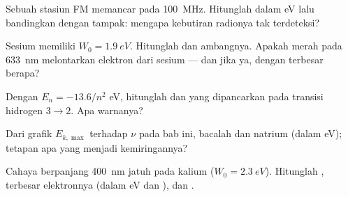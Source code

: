 \begin{exercise}[$\star$]\label{exo:g12:quantum-world:2}
Sebuah stasiun FM memancar pada \qty{100}{MHz}. Hitunglah   dalam
\unit{eV} lalu bandingkan dengan  tampak: mengapa kebutiran radionya tak terdeteksi?
\end{exercise}

\begin{exercise}[$\star$]\label{exo:g12:quantum-world:3}
Sesium memiliki $W_0 = \qty{1.9}{eV}$. Hitunglah  dan 
ambangnya. Apakah  merah pada \qty{633}{nm} melontarkan elektron dari sesium ---
dan jika ya, dengan  terbesar berapa?
\end{exercise}

\begin{exercise}[$\star$]\label{exo:g12:quantum-world:4}
Dengan $E_n = -13.6/n^2$ \unit{eV}, hitunglah  dan 
 yang dipancarkan pada transisi hidrogen $3 \to 2$. Apa warnanya?
\end{exercise}

\begin{exercise}[$\star$]\label{exo:g12:quantum-world:5}
Dari grafik $E_{k,\max}$ terhadap $\nu$ pada bab ini, bacalah 
dan  natrium (dalam \unit{eV}); tetapan apa yang menjadi kemiringannya?
\end{exercise}

\begin{exercise}[$\star\star$]\label{exo:g12:quantum-world:6}
Cahaya berpanjang  \qty{400}{nm} jatuh pada kalium ($W_0 = \qty{2.3}{eV}$).
Hitunglah  ,  terbesar elektronnya
(dalam \unit{eV} dan ), dan .
\end{exercise}

